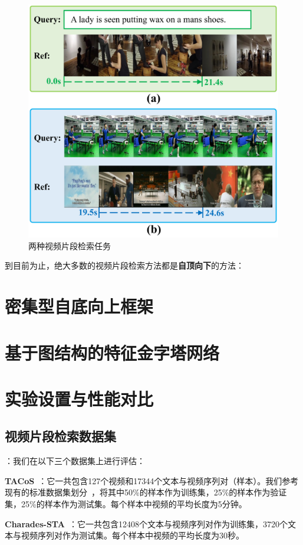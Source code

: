 \begin{figure}[htbp]
    \centering
    \includegraphics[width=0.7\linewidth]{chapter6/res/qbvl.pdf}
    \caption{两种视频片段检索任务}
    \label{ch5:fig:qbvl}
\end{figure}

到目前为止，绝大多数的视频片段检索方法都是\textbf{自顶向下}的方法：

\section{密集型自底向上框架}


\section{基于图结构的特征金字塔网络}


\section{实验设置与性能对比}

\subsection{视频片段检索数据集}

\noindent\textbf{}：我们在以下三个数据集上进行评估：

\noindent\textbf{TACoS}~\cite{regneri2013grounding}：它一共包含127个视频和17344个文本与视频序列对（样本）。我们参考现有的标准数据集划分~\cite{gao2017tall}，将其中50\%的样本作为训练集，25\%的样本作为验证集，25\%的样本作为测试集。每个样本中视频的平均长度为5分钟。


\noindent\textbf{Charades-STA}~\cite{gao2017tall}：它一共包含12408个文本与视频序列对作为训练集，3720个文本与视频序列对作为测试集。每个样本中视频的平均长度为30秒。



